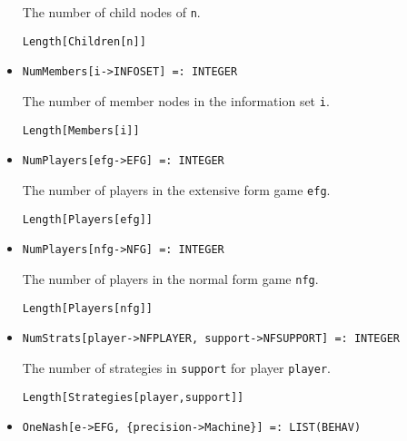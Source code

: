 \begin{itemize}
\bd 
The number of child nodes of \verb+n+.
\begin{verbatim}
Length[Children[n]]
\end{verbatim} 
\ed

\item{}
\protect \large \begin{verbatim}
NumMembers[i->INFOSET] =: INTEGER 
\end{verbatim}\normalsize

\bd 
The number of member nodes in the information set \verb+i+.
\begin{verbatim}
Length[Members[i]]
\end{verbatim} 
\ed

\item{}
\protect \large \begin{verbatim}
NumPlayers[efg->EFG] =: INTEGER 
\end{verbatim}\normalsize

\bd 
The number of players in the extensive form game \verb+efg+.
\begin{verbatim}
Length[Players[efg]]
\end{verbatim} 
\ed

\item{}
\protect \large \begin{verbatim}
NumPlayers[nfg->NFG] =: INTEGER 
\end{verbatim}\normalsize

\bd 
The number of players in the normal form game \verb+nfg+.
\begin{verbatim}
Length[Players[nfg]]
\end{verbatim} 
\ed

\item{}
\protect \large \begin{verbatim}
NumStrats[player->NFPLAYER, support->NFSUPPORT] =: INTEGER 
\end{verbatim}\normalsize

\bd 
The number of strategies in \verb+support+ for player \verb+player+.
\begin{verbatim}
Length[Strategies[player,support]] 
\end{verbatim} 
\ed


\item{}
\protect \large \begin{verbatim}
OneNash[e->EFG, {precision->Machine}] =: LIST(BEHAV) 
\end{verbatim}\normalsize


\end{itemize}
